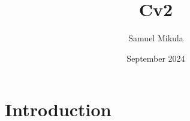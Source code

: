\documentclass{article}
\title{Cv2}
\author{Samuel Mikula}
\date{September 2024}
\begin{document}
\maketitle

\section{Introduction}
\end{document}
